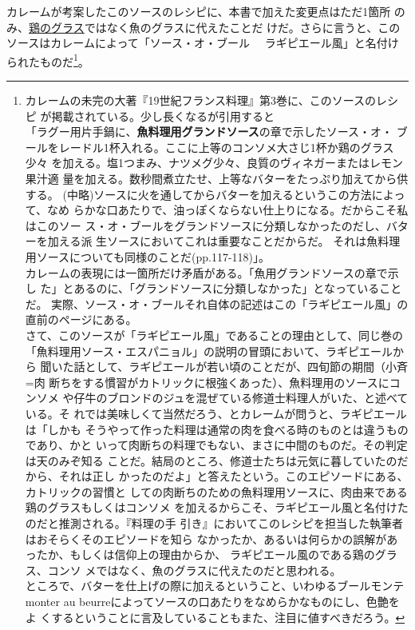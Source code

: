\begin{recette}
カレームが考案したこのソースのレシピに、本書で加えた変更点はただ1箇所
のみ、\protect\hyperlink{glace-de-volaille}{鶏のグラス}ではなく魚のグラスに代えたことだ
けだ。さらに言うと、このソースはカレームによって「ソース・オ・ブール　
ラギピエール風」と名付けられたものだ\footnote{カレームの未完の大著『19世紀フランス料理』第3巻に、このソースのレシピ
  が掲載されている。少し長くなるが引用すると\\
  「ラグー用片手鍋に、\textbf{魚料理用グランドソース}の章で示したソース・オ・
  ブールをレードル1杯入れる。ここに上等のコンソメ大さじ1杯か鶏のグラス少々
  を加える。塩1つまみ、ナツメグ少々、良質のヴィネガーまたはレモン果汁適
  量を加える。数秒間煮立たせ、上等なバターをたっぷり加えてから供する。
  (中略)ソースに火を通してからバターを加えるというこの方法によって、なめ
  らかな口あたりで、油っぽくならない仕上りになる。だからこそ私はこのソー
  ス・オ・ブールをグランドソースに分類しなかったのだし、バターを加える派
  生ソースにおいてこれは重要なことだからだ。
  それは魚料理用ソースについても同様のことだ(pp.117-118)」。\\
  カレームの表現には一箇所だけ矛盾がある。「魚用グランドソースの章で示し
  た」とあるのに、「グランドソースに分類しなかった」となっていることだ。
  実際、ソース・オ・ブールそれ自体の記述はこの「ラギピエール風」の直前のページにある。\\
  さて、このソースが「ラギピエール風」であることの理由として、同じ巻の
  「魚料理用ソース・エスパニョル」の説明の冒頭において、ラギピエールから
  聞いた話として、ラギピエールが若い頃のことだが、四旬節の期間（小斉=肉
  断ちをする慣習がカトリックに根強くあった）、魚料理用のソースにコンソメ
  や仔牛のブロンドのジュを混ぜている修道士料理人がいた、と述べている。そ
  れでは美味しくて当然だろう、とカレームが問うと、ラギピエールは「しかも
  そうやって作った料理は通常の肉を食べる時のものとは違うものであり、かと
  いって肉断ちの料理でもない、まさに中間のものだ。その判定は天のみぞ知る
  ことだ。結局のところ、修道士たちは元気に暮していたのだから、それは正し
  かったのだよ」と答えたという。このエピソードにある、カトリックの習慣と
  しての肉断ちのための魚料理用ソースに、肉由来である鶏のグラスもしくはコンソメ
  を加えるからこそ、ラギピエール風と名付けたのだと推測される。『料理の手
  引き』においてこのレシピを担当した執筆者はおそらくそのエピソードを知ら
  なかったか、あるいは何らかの誤解があったか、もしくは信仰上の理由からか、
  ラギピエール風のである鶏のグラス、コンソ
  メではなく、魚のグラスに代えたのだと思われる。\\
  ところで、バターを仕上げの際に加えるということ、いわゆるブールモンテ
  monter au beurreによってソースの口あたりをなめらかなものにし、色艶をよ
  くするということに言及していることもまた、注目に値すべきだろう。}。


\end{recette}

